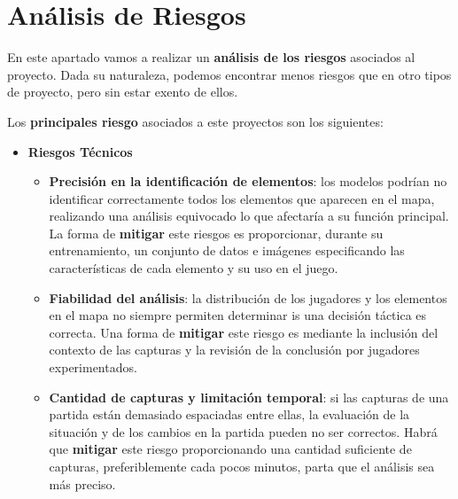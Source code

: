 \section{Análisis de Riesgos}
En este apartado vamos a realizar un \textbf{análisis de los riesgos} asociados al proyecto. Dada su naturaleza, podemos encontrar menos riesgos que en otro tipos de proyecto, pero sin estar exento de ellos. 

Los \textbf{principales riesgo} asociados a este proyectos son los siguientes: 

\begin{itemize}
	\item \textbf{Riesgos Técnicos}
	\begin{itemize}
		\item \textbf{Precisión en la identificación de elementos}: los modelos podrían no identificar correctamente todos los elementos que aparecen en el mapa, realizando una análisis equivocado lo que afectaría a su función principal. La forma de \textbf{mitigar} este riesgos es proporcionar, durante su entrenamiento, un conjunto de datos e imágenes especificando las características de cada elemento y su uso en el juego.	
		
		\item \textbf{Fiabilidad del análisis}: la distribución de los jugadores y los elementos en el mapa no siempre permiten determinar is una decisión táctica es correcta. Una forma de \textbf{mitigar} este riesgo es mediante la inclusión del contexto de las capturas y la revisión de la conclusión por jugadores experimentados.
		
		\item \textbf{Cantidad de capturas y limitación temporal}: si las capturas de una partida están demasiado espaciadas entre ellas, la evaluación de la situación y de los cambios en la partida pueden no ser correctos. Habrá que \textbf{mitigar} este riesgo proporcionando una cantidad suficiente de capturas, preferiblemente cada pocos minutos, parta que el análisis sea más preciso.
	\end{itemize}
	

\end{itemize}
